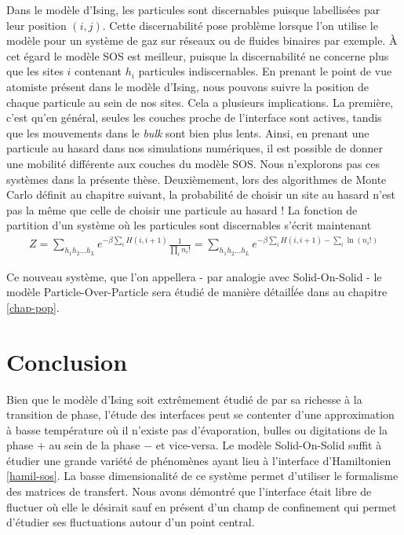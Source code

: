 Dans le modèle d'Ising, les particules sont discernables puisque labellisées par leur position $(i,j)$. Cette discernabilité pose problème lorsque l'on utilise le modèle pour un système de gaz sur réseaux ou de fluides binaires par exemple. À cet égard le modèle SOS est meilleur, puisque la discernabilité ne concerne plus que les sites $i$ contenant $h_i$ particules indiscernables. 
En prenant le point de vue atomiste présent dans le modèle d'Ising, nous pouvons suivre la position de chaque particule au sein de nos sites. Cela a plusieurs implications.
La première, c'est qu'en général, seules les couches proche de l'interface sont actives, tandis que les mouvements dans le \textit{bulk} sont bien plus lents. Ainsi, en prenant une particule au hasard dans nos simulations numériques, il est possible de donner une mobilité différente aux couches du modèle SOS. Nous n'explorons pas ces systèmes dans la présente thèse. 
Deuxièmement, lors des algorithmes de Monte Carlo définit au chapitre suivant, la probabilité de choisir un site au hasard n'est pas la même que celle de choisir une particule au hasard ! 
La fonction de partition d'un système où les particules sont discernables s'écrit maintenant
\begin{align}
	Z = \sum_{h_1 h_2 ... h_L} e^{- \beta \sum_{i} H(i,i+1)} \frac{1}{\prod_i n_i!} = \sum_{h_1 h_2 ... h_L} e^{- \beta \sum_{i} H(i,i+1) -\sum_i \ln(n_i!)}
\end{align}

Ce nouveau système, que l'on appellera - par analogie avec Solid-On-Solid - le modèle Particle-Over-Particle sera étudié de manière détailĺée dans au chapitre \ref{chap-pop}.

\section{Conclusion}

Bien que le modèle d'Ising soit extrêmement étudié de par sa richesse à la transition de phase, l'étude des interfaces peut se contenter d'une approximation à basse température où il n'existe pas d'évaporation, bulles ou digitations de la phase $+$ au sein de la phase $-$ et vice-versa. Le modèle Solid-On-Solid suffit à étudier une grande variété de phénomènes ayant lieu à l'interface d'Hamiltonien \ref{hamil-sos}. 
La basse dimensionalité de ce système permet d'utiliser le formalisme des matrices de transfert. 
Nous avons démontré que l'interface était libre de fluctuer où elle le désirait sauf en présent d'un champ de confinement qui permet d'étudier ses fluctuations autour d'un point central.
